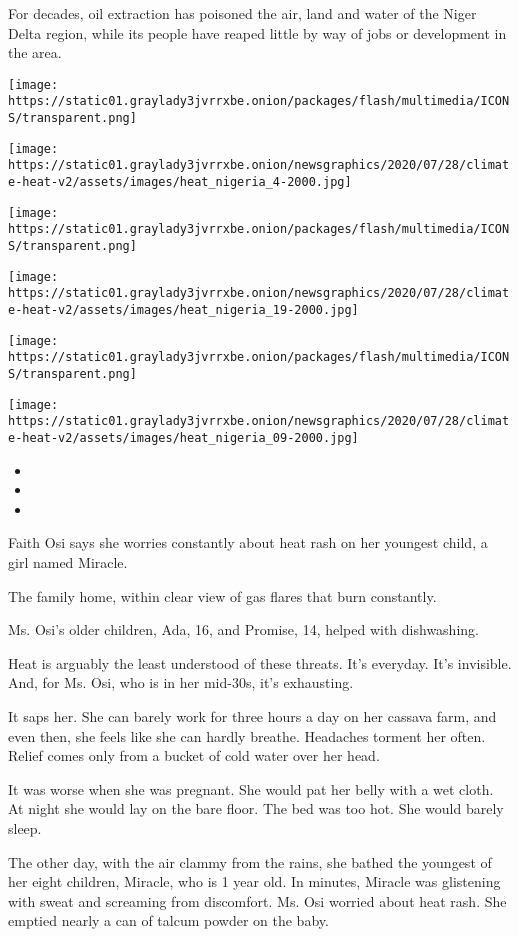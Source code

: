 For decades, oil extraction has poisoned the air, land and water of the
Niger Delta region, while its people have reaped little by way of jobs
or development in the area.

\texttt{[image: https://static01.graylady3jvrrxbe.onion/packages/flash/multimedia/ICONS/transparent.png]}

\texttt{[image: https://static01.graylady3jvrrxbe.onion/newsgraphics/2020/07/28/climate-heat-v2/assets/images/heat\_nigeria\_4-2000.jpg]}

\texttt{[image: https://static01.graylady3jvrrxbe.onion/packages/flash/multimedia/ICONS/transparent.png]}

\texttt{[image: https://static01.graylady3jvrrxbe.onion/newsgraphics/2020/07/28/climate-heat-v2/assets/images/heat\_nigeria\_19-2000.jpg]}

\texttt{[image: https://static01.graylady3jvrrxbe.onion/packages/flash/multimedia/ICONS/transparent.png]}

\texttt{[image: https://static01.graylady3jvrrxbe.onion/newsgraphics/2020/07/28/climate-heat-v2/assets/images/heat\_nigeria\_09-2000.jpg]}

\begin{itemize}
\item
\item
\item
\end{itemize}

Faith Osi says she worries constantly about heat rash on her youngest
child, a girl named Miracle.

The family home, within clear view of gas flares that burn constantly.

 Ms. Osi's older children, Ada, 16, and Promise, 14, helped with
dishwashing.

Heat is arguably the least understood of these threats. It's everyday.
It's invisible. And, for Ms. Osi, who is in her mid-30s, it's
exhausting.

It saps her. She can barely work for three hours a day on her cassava
farm, and even then, she feels like she can hardly breathe. Headaches
torment her often. Relief comes only from a bucket of cold water over
her head.

It was worse when she was pregnant. She would pat her belly with a wet
cloth. At night she would lay on the bare floor. The bed was too hot.
She would barely sleep.

The other day, with the air clammy from the rains, she bathed the
youngest of her eight children, Miracle, who is 1 year old. In minutes,
Miracle was glistening with sweat and screaming from discomfort. Ms. Osi
worried about heat rash. She emptied nearly a can of talcum powder on
the baby.

